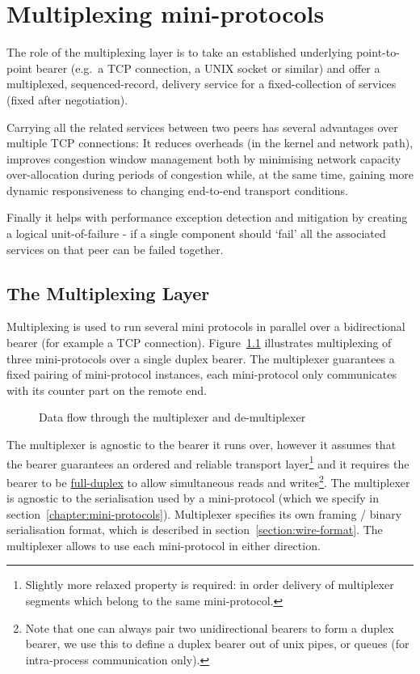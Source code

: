 \chapter{Multiplexing mini-protocols}
\label{chapter:multiplexer}

The role of the multiplexing layer is to take an established underlying
point-to-point bearer (e.g.~a TCP connection, a UNIX socket or similar) and
offer a multiplexed, sequenced-record, delivery service for a fixed-collection of
services (fixed after negotiation). 

Carrying all the related services between two peers has several advantages over
multiple TCP connections: It reduces overheads (in the kernel and network path),
improves congestion window management both by minimising network capacity
over-allocation during periods of congestion while, at the same time, gaining
more dynamic responsiveness to changing end-to-end transport conditions.

Finally it helps with performance exception detection and mitigation by creating
a logical unit-of-failure - if a single component should `fail' all the
associated services on that peer can be failed together.

\section{The Multiplexing Layer}
\label{multiplexing-section}
Multiplexing is used to run several mini protocols in parallel over
a bidirectional bearer (for example a TCP connection).
Figure~\ref{mux-diagram} illustrates multiplexing of three mini-protocols over
a single duplex bearer.  The multiplexer guarantees a fixed pairing of
mini-protocol instances, each mini-protocol only communicates with its counter
part on the remote end.

\begin{figure}[ht]
\begin{center}
\end{center}
\caption{Data flow through the multiplexer and de-multiplexer}
\label{mux-diagram}
\end{figure}


The multiplexer is agnostic to the bearer it runs over, however it assumes that
the bearer guarantees an ordered and reliable transport layer\footnote{Slightly
more relaxed property is required: in order delivery of multiplexer segments
which belong to the same mini-protocol.} and it requires the bearer to be
\href{https://www.wikiwand.com/en/Duplex_(telecommunications)\#/Full-duplex}{full-duplex}
to allow simultaneous reads and writes\footnote{Note that one can always pair
two unidirectional bearers to form a duplex bearer, we use this to define
a duplex bearer out of unix pipes, or queues (for intra-process communication
only).}.  The multiplexer is agnostic to the serialisation used by
a mini-protocol (which we specify in section~\ref{chapter:mini-protocols}).
Multiplexer specifies its own framing / binary serialisation format, which is
described in section~\ref{section:wire-format}.  The multiplexer allows to use
each mini-protocol in either direction.

